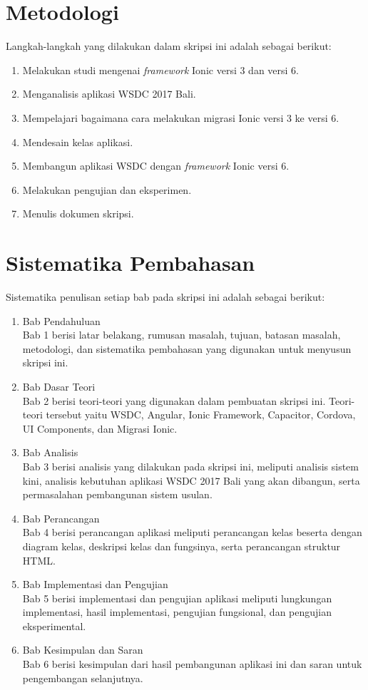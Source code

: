 \section{Metodologi}
\label{sec:metlit}

Langkah-langkah yang dilakukan dalam skripsi ini adalah sebagai berikut:

\begin{enumerate}
	\item Melakukan studi mengenai {\it framework} Ionic versi 3 dan versi 6.
	\item Menganalisis aplikasi WSDC 2017 Bali.
	\item Mempelajari bagaimana cara melakukan migrasi Ionic versi 3 ke versi 6.
	\item Mendesain kelas aplikasi.
	\item Membangun aplikasi WSDC dengan {\it framework} Ionic versi 6. 
	\item Melakukan pengujian dan eksperimen.
	\item Menulis dokumen skripsi.
\end{enumerate}


\section{Sistematika Pembahasan}
\label{sec:sispem}

Sistematika penulisan setiap bab pada skripsi ini adalah sebagai berikut:
\begin{enumerate}
	\item Bab Pendahuluan \\
	Bab 1 berisi latar belakang, rumusan masalah, tujuan, batasan masalah, metodologi, dan sistematika pembahasan yang digunakan untuk menyusun skripsi ini.
	\item Bab Dasar Teori \\
	Bab 2 berisi teori-teori yang digunakan dalam pembuatan skripsi ini. Teori-teori tersebut yaitu WSDC, Angular, Ionic Framework, Capacitor, Cordova, UI Components, dan Migrasi Ionic.
	\item Bab Analisis \\
	Bab 3 berisi analisis yang dilakukan pada skripsi ini, meliputi analisis sistem kini, analisis kebutuhan aplikasi WSDC 2017 Bali yang akan dibangun, serta permasalahan pembangunan sistem usulan.
	\item Bab Perancangan \\
	Bab 4 berisi perancangan aplikasi meliputi perancangan kelas beserta dengan diagram kelas, deskripsi kelas dan fungsinya, serta perancangan struktur HTML.
	\item Bab Implementasi dan Pengujian \\
	Bab 5 berisi implementasi dan pengujian aplikasi meliputi lungkungan implementasi, hasil implementasi, pengujian fungsional, dan pengujian eksperimental.
	\item Bab Kesimpulan dan Saran \\
	Bab 6 berisi kesimpulan dari hasil pembangunan aplikasi ini dan saran untuk pengembangan selanjutnya.
	\end{enumerate}